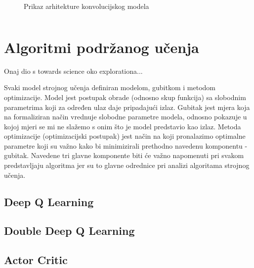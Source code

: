 \begin{figure}[H]
    \centering
    \caption{Prikaz arhitekture konvolucijskog modela}
    \label{fig:cnn}
\end{figure}

\begin{listing}[H]
    \caption{Implementacija konvolucijskog modela na slici \ref{fig:cnn} koristeći biblioteku \textit{PyTorch}}
    \inputminted{python}{snippets/cnn.py}
    \label{lst:cnn}
\end{listing}

\section{Algoritmi podržanog učenja}

Onaj dio s towards science oko explorationa...

Svaki model strojnog učenja definiran modelom, gubitkom i metodom optimizacije. Model jest postupak obrade (odnosno skup funkcija) sa slobodnim parametrima koji za određen ulaz daje pripadajući izlaz. Gubitak jest mjera koja na formaliziran način vrednuje slobodne parametre modela, odnosno pokazuje u kojoj mjeri se mi ne slažemo s onim što je model predstavio kao izlaz. Metoda optimizacije (optimizacijski postupak) jest način na koji pronalazimo optimalne parametre koji su važno kako bi minimizirali prethodno navedenu komponentu - gubitak. Navedene tri glavne komponente biti će važno napomenuti pri svakom predstavljaju algoritma jer su to glavne odrednice pri analizi algoritama strojnog učenja.


\subsection{Deep Q Learning}
\subsection{Double Deep Q Learning}
\subsection{Actor Critic}

